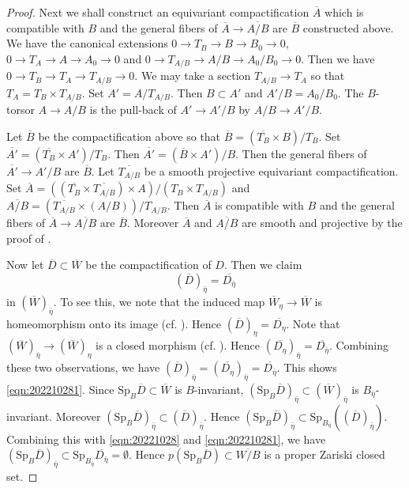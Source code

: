 \documentclass[11pt,english]{smfart}
\theoremstyle{plain}
\theoremstyle{definition}
\theoremstyle{remark}
\numberwithin{equation}{section}
\theoremstyle{plain}
\begin{document}
\begin{proof}
		
		Next we shall construct an equivariant compactification $\overline{A}$ which is compatible with $B$ and the general fibers of $\overline{A}\to\overline{A/B}$ are $\overline{B}$ constructed above.
		We have the canonical extensions $0\to T_B\to B\to B_0\to 0$, $0\to T_A\to A\to A_0\to 0$ and $0\to T_{A/B}\to A/B\to A_0/B_0\to 0$.
		Then we have $0\to T_B\to T_A\to T_{A/B}\to 0$.
		We may take a section $T_{A/B}\to T_A$ so that $T_A=T_B\times T_{A/B}$.
		Set $A'=A/T_{A/B}$.
		Then $B\subset A'$ and $A'/B=A_0/B_0$.
		The $B$-torsor $A\to A/B$ is the pull-back of $A'\to A'/B$ by $A/B\to A'/B$. 
		
		Let $\overline{B}$ be the compactification above so that $\overline{B}=(\overline{T_B}\times B)/T_B$.
		Set $\overline{A'}=(\overline{T_B}\times A')/T_B$.
		Then $\overline{A'}=(\overline{B}\times A')/B$. 
		Then the general fibers of $\overline{A'}\to A'/B$ are $\overline{B}$.
		Let $\overline{T_{A/B}}$ be a smooth projective equivariant compactification.
		Set $\overline{A}=((\overline{T_B}\times \overline{T_{A/B}})\times A)/(T_B\times T_{A/B})$ and $\overline{A/B}=(\overline{T_{A/B}}\times (A/B))/T_{A/B}$.
		Then $\overline{A}$ is compatible with $B$ and the general fibers of $\overline{A}\to\overline{A/B}$ are $\overline{B}$.
		Moreover $\overline{A}$ and $\overline{A/B}$ are smooth and projective by the proof of \cite[Lem A.8]{Y22}.
		
		
		Now let $\overline{D}\subset \overline{W}$ be the compactification of $D$.
		Then we claim
		\begin{equation}\label{eqn:202210281}
			(\overline{D})_{\bar{\eta}}=\overline{D_{\bar{\eta}}}
		\end{equation}
		in $(\overline{W})_{\bar{\eta}}
		$.
		To see this, we note that the induced map $\overline{W}_{\eta}\to \overline{W}$ is homeomorphism onto its image (cf. \cite[\href{https://stacks.math.columbia.edu/tag/01K1}{Tag 01K1}]{stacks-project}). 
		Hence $(\overline{D})_{\eta}=\overline{D_{\eta}}$.
		Note that $(\overline{W})_{\bar{\eta}}\to (\overline{W})_{\eta}$ is a closed morphism (cf.  \cite[\href{https://stacks.math.columbia.edu/tag/01WM}{Tag 01WM}]{stacks-project}).
		Hence $(\overline{D_{\eta}})_{\bar{\eta}}=\overline{D_{\bar{\eta}}}$.
		Combining these two observations, we have
		$(\overline{D})_{\bar{\eta}}=(\overline{D_{\eta}})_{\bar{\eta}}=\overline{D_{\bar{\eta}}}$.
		This shows \eqref{eqn:202210281}.
		Since $\mathrm{Sp}_B\overline{D}\subset \overline{W}$ is $B$-invariant, $(\mathrm{Sp}_B\overline{D})_{\bar{\eta}}\subset (\overline{W})_{\bar{\eta}}$ is $B_{\bar{\eta}}$-invariant.
		Moreover $(\mathrm{Sp}_B\overline{D})_{\bar{\eta}}\subset (\overline{D})_{\bar{\eta}}$.
		Hence $(\mathrm{Sp}_B\overline{D})_{\bar{\eta}}\subset\mathrm{Sp}_{B_{\bar{\eta}}}((\overline{D})_{\bar{\eta}})$.
		Combining this with \eqref{eqn:20221028} and \eqref{eqn:202210281},
		we have
		$(\mathrm{Sp}_B\overline{D})_{\bar{\eta}}\subset\mathrm{Sp}_{B_{\bar{\eta}}}\overline{D_{\bar{\eta}}}=\emptyset$.
		Hence $p(\mathrm{Sp}_B\overline{D})\subset \overline{W/B}$ is a proper Zariski closed set.
	\end{proof}
	
\end{document}
